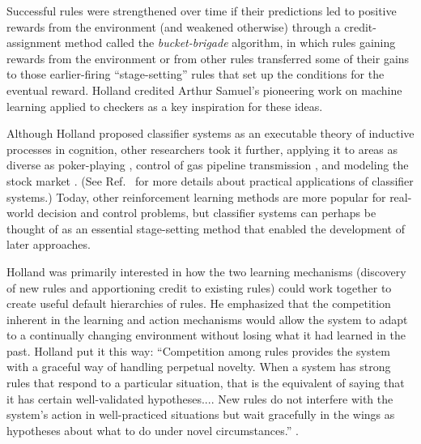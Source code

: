 \documentclass{sig-alternate}
\begin{document}
Successful rules were strengthened over time if their predictions led
to positive rewards from the environment (and weakened otherwise)
through a credit-assignment method called the \emph{bucket-brigade}
algorithm, in which rules gaining rewards from the environment or from
other rules transferred some of their gains to those earlier-firing
``stage-setting'' rules that set up the conditions for the eventual
reward. Holland credited Arthur Samuel's pioneering work on machine
learning applied to checkers \cite{Samuel1959} as a key inspiration for these ideas.


Although Holland proposed classifier systems as 
an executable theory of inductive processes in cognition, other researchers took it further, 
applying it to areas as diverse
as poker-playing \cite{Smith1980}, control of gas pipeline
transmission \cite{Goldberg1983}, and modeling the stock market
\cite{Palmer1994}.  (See Ref.~\cite{Booker1989} for more details about
practical applications of classifier systems.)  Today, other
reinforcement learning methods are more popular for real-world
decision and control problems, but classifier systems can perhaps be
thought of as an essential stage-setting method that enabled the
development of later approaches.


Holland was primarily interested in how the two
learning mechanisms (discovery of new rules and apportioning credit to
existing rules) could work together to create 
useful default hierarchies of rules.  He emphasized that the
competition inherent in the learning and action mechanisms would allow
the system to adapt to a continually changing environment without
losing what it had learned in the past.  Holland put it this way:
``Competition among rules provides the system with a graceful way of
handling perpetual novelty.  When a system has strong rules that
respond to a particular situation, that is the equivalent of saying
that it has certain well-validated hypotheses.... New rules do not
interfere with the system's action in well-practiced situations but
wait gracefully in the wings as hypotheses about what to do under
novel circumstances.'' \cite{Holland1992}.
\end{document}
